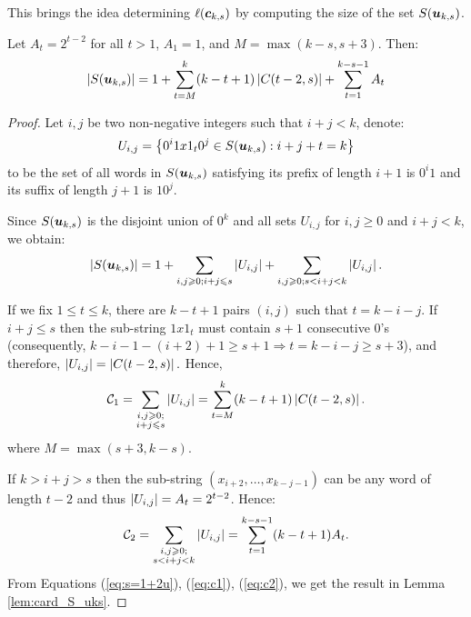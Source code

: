 This brings the idea determining $\ell({\boldsymbol c}_{k,s})$ by computing the size of the set $S({\boldsymbol u}_{k,s})$. 
\begin{lemma}\label{lem:card_S_uks}
    Let $A_{t} = 2^{t-2}$ for all $t>1$, $A_{1}=1$, and $M=\max{(k-s,s+3)}$. Then:
    \begin{align}
        \left \lvert  S({\boldsymbol u}_{k,s}) \right \rvert= 1 + \sum_{t=M}^{k}(k-t+1)\left \lvert C(t-2,s) \right \rvert + \sum_{t=1}^{k-s-1}A_{t} \label{eq:card_S_uks}
    \end{align}
\end{lemma}
\begin{proof}
    Let $i,j$ be two non-negative integers such that $i+j<k$, denote:
    $$U_{i,j}= \left\{0^{i}1x1_{t}0^{j}\in S({\boldsymbol u}_{k,s}): i+j+t=k\right\}$$
    to be the set of all words in $S({\boldsymbol u}_{k,s})$ satisfying its prefix of length $i+1$ is $0^{i}1$ and its suffix of length $j+1$ is $10^{j}$.
    
    Since $S({\boldsymbol u}_{k,s})$ is the disjoint union of $0^k$ and all sets $U_{i,j}$ for $i,j \geq 0$ and $i+j<k$, we obtain:
    \begin{equation}\label{eq:s=1+2u}
        \left \lvert S({\boldsymbol u}_{k,s}) \right \rvert= 1 +\sum_{\substack{i,j\geqslant 0 ; i+j \leqslant s}} \left \lvert U_{i,j} \right \rvert+\sum_{\substack{i,j\geqslant 0 ; s < i+j<k}} \left \lvert U_{i,j} \right \rvert.
    \end{equation}
    
    If we fix $1\leq t \leq k$, there are $k-t+1$ pairs $(i,j)$ such that $t=k-i-j$. If $i+j \leq s$ then the sub-string $1x1_{t}$ must contain $s+1$ consecutive 0's (consequently, $k-i-1-(i+2)+1\geq s+1\Rightarrow t=k-i-j\geq s+3$), and therefore, $\left \lvert U_{i,j} \right \rvert=\left \lvert C(t-2,s) \right \rvert.$ 
    Hence,
    \begin{equation}\label{eq:c1}
        {\cal C}_1= \sum_{\substack{i,j\geqslant 0 ;\\ i+j \leqslant s}} \left \lvert U_{i,j} \right \rvert = \sum_{t=M}^{k}(k-t+1)\left \lvert C(t-2,s) \right \rvert. 
    \end{equation}
    where $M=\max(s+3,k-s)$.
    
    If $k>i+j > s$ then the sub-string $(x_{i+2},\ldots,x_{k-j-1})$ can be any word of length $t-2$ and thus $\left \lvert U_{i,j} \right \rvert=A_t=2^{t-2}$. Hence:
    \begin{equation}\label{eq:c2}
        {\cal C}_2=\sum_{\substack{i,j\geqslant 0 ;\\ s< i+j<k}} \left \lvert U_{i,j} \right \rvert= \sum_{t=1}^{k-s-1}(k-t+1)A_{t}.
    \end{equation}
    From Equations (\ref{eq:s=1+2u}), (\ref{eq:c1}), (\ref{eq:c2}), we get the result in Lemma \ref{lem:card_S_uks}.
\end{proof}

